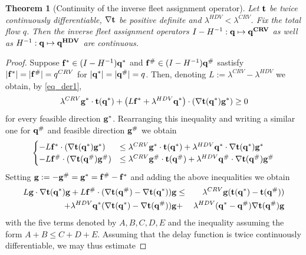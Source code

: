 \documentclass[a4paper,11pt]{article}
\newtheorem{theorem}{Theorem}
\begin{document}
\begin{theorem}[Continuity of the inverse fleet assignment operator]
\label{Th_continuity}
Let $\bold{t}$ be twice continuously differentiable, $\nabla \bold{t}$ be positive definite and  $\lambda^{HDV} < \lambda^{CRV}$. Fix the total flow $q$. Then the inverse fleet assignment operators $I - H^{-1} : \bold{q}\mapsto \bold{q^{CRV}}$ as well as $H^{-1}: \bold{q}\mapsto \bold{q^{HDV}}$ are continuous.  
\end{theorem}
\begin{proof}
Suppose $\bold{f}^* \in (I - H^{-1}) \bold{q}^*$ and $\bold{f}^\# \in (I - H^{-1}) \bold{q}^\#$ sastisfy $|\bold{f}^*| = |\bold{f}^\#| = q^{CRV}$ for $|\bold{q}^*| = |\bold{q}^\#| = q$. Then, denoting $L:= \lambda^{CRV} - \lambda^{HDV}$ we obtain, by 
\eqref{eq_der1}, 
\begin{equation*}
\lambda^{CRV} \bold{g^*}\cdot \bold{t(q^*)} + \left(L \bold{f^*} + \lambda^{HDV}\bold{q^*}\right) \cdot (\nabla \bold{t}(\bold{q^*}) {\bold{g^*}})  \ge 0 
\end{equation*}
for every feasible direction $\bold{g}^*$. Rearranging this inequality and writing a similar one for $\bold{q}^\#$ and feasible direction $\bold{g}^\#$ we obtain
\begin{equation*}
\begin{cases}
-L\bold{f}^* \cdot (\nabla \bold{t}(\bold{q}^*)  \bold{g^*}) &\le \lambda^{CRV} \bold{g^*} \cdot \bold{t}(\bold{q}^*) + \lambda^{HDV} \bold{q}^* \cdot \nabla \bold{t}(\bold{q}^*) \bold{g^*}\\
-L\bold{f}^\# \cdot (\nabla \bold{t}(\bold{q}^\#)  \bold{g^\#}) &\le \lambda^{CRV} \bold{g^\#} \cdot \bold{t}(\bold{q}^\#) + \lambda^{HDV} \bold{q}^\# \cdot \nabla \bold{t}(\bold{q}^\#) \bold{g^\#}
\end{cases}
\end{equation*}
Setting $\bold{g}:= -\bold{g}^\# = \bold{g}^* = \bold{f}^\# - \bold{f}^*$ and adding the above inequalities we obtain
\begin{eqnarray*}
L\bold{g} \cdot \nabla \bold{t}(\bold{q}^*) \bold{g} + L\bold{f}^\# \cdot (\nabla \bold{t}(\bold{q}^\#) - \nabla \bold{t}(\bold{q}^*)) \bold{g} &\le&  \lambda^{CRV} \bold{g}(\bold{t}(\bold{q}^*) - \bold{t}(\bold{q}^\#))\\ +  \lambda^{HDV} \bold{q}^*(\nabla \bold{t}(\bold{q}^*) - \nabla \bold{t}(\bold{q}^\#))\bold{g} &+& \lambda^{HDV} (\bold{q}^* - \bold{q}^\#) \nabla \bold{t}(\bold{q}^\#) \bold {g}
\end{eqnarray*}
with the five terms denoted by $A, B, C, D, E$ and the inequality assuming the form $A + B \le C + D + E$. Assuming that the delay function is twice continuously differentiable, we may thus estimate

\end{proof}
\end{document}

